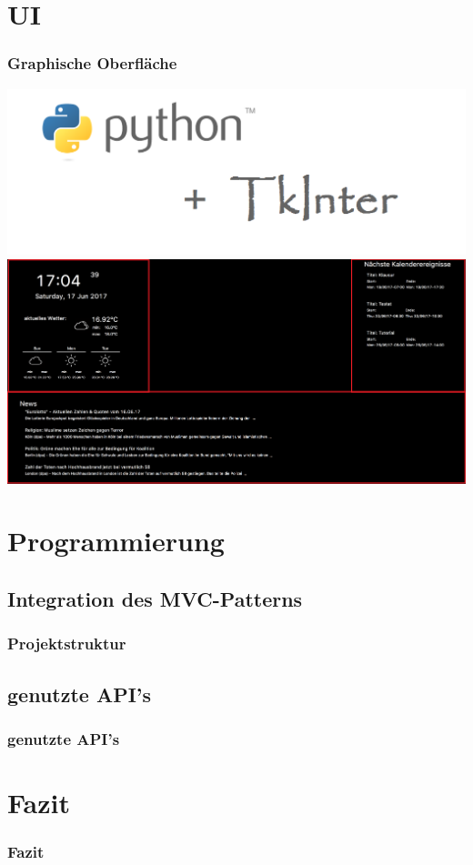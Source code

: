\documentclass[11pt]{beamer}
\begin{document}
	\section{UI}
	\begin{frame}
		\frametitle{Graphische Oberfl\"ache}
		\begin{center}
			\includegraphics[scale=0.3]{images/python+tkinter.png}
			\linebreak
			\includegraphics[scale=0.2]{images/grafOberflaeche.png}
		\end{center}
	\end{frame}
		
	\section{Programmierung}
	\subsection{Integration des MVC-Patterns}
	\begin{frame}
		\frametitle{Projektstruktur}
	\end{frame}

	\subsection{genutzte API's}
	\begin{frame}
		\frametitle{genutzte API's}
	\end{frame}

	
	\section{Fazit}
	\begin{frame}
		\frametitle{Fazit}
	\end{frame}
\end{document}

